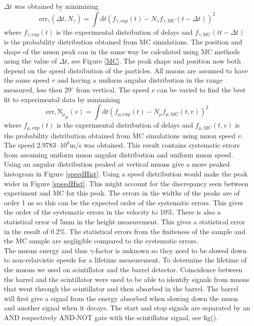 \documentclass[10pt,twocolumn]{article}
\begin{document}
$\Delta t$ was obtained by minimizing
\begin{equation}
 \mathrm{err}_\gamma(\Delta t, N_\gamma)=\int\mathrm{d}t\left(f_{\gamma,\mathrm{exp}}(t)-N_\gamma f_{\gamma,\mathrm{MC}}(t-\Delta t)\right)^2
\end{equation}
where $f_{\gamma,\mathrm{exp}}(t)$ is the experimental distribution of delays and $f_{\gamma,\mathrm{MC}}(tt-\Delta t)$ is the probability distribution obtained from MC simulations. The position and shape of the muon peak can in the same way be calculated using MC methods using the value of $\Delta t$, see Figure \ref{MC}. The peak shape and position now both depend on the speed distribution of the particles. All muons are assumed to have the same speed $v$ and having a uniform angular distribution in the range measured, less then $29^\circ$ from vertical. The speed $v$ can be varied to find the best fit to experimental data by minimizing
\begin{equation}
 \mathrm{err,N_\mu}_\mu(v)=\int\mathrm{d}t\left(f_{\mu,\mathrm{exp}}(t)-N_\mu f_{\mu,\mathrm{MC}}(t,v)\right)^2
\end{equation}
where $f_{\mu,\mathrm{exp}}(t)$ is the experimental distribution of delays and $f_{\mu,\mathrm{MC}}(t,v)$ is the probability distribution obtained from MC simulations using muon speed $v$. The speed $2.9783\cdot10^8$m/s was obtained. This result contains systematic errors from assuming uniform muon angular distribution and uniform muon speed. Using an angular distribution peaked at vertical muons give a more peaked histogram in Figure \ref{speedHist}. Using a speed distribution would make the peak wider in Figure \ref{speedHist}. This might account for the discrepancy seen between experiment and MC for this peak. The errors in the widths of the peaks are of order 1 ns so this can be the expected order of the systematic errors. This gives the order of the systematic errors in the velocity to 10\%. There is also a statistical error of 5mm in the height measurement. This gives a statistical error in the result of 0.2\%. The statistical errors from the finiteness of the sample and the MC sample are negligible compared to the systematic errors.\\

The muons energy and thus $\gamma$-factor is unknown so they need to be slowed down to non-relaivistic speeds for a lifetime measurement. To determine the lifetime of the muons we used on scintillator and the barrel detector. Coincidence between the barrel and the scintillator were used to be able to identify signals from muons that went through the scintillator and then absorbed in the barrel. The barrel will first give a signal from the energy absorbed when slowing down the muon and another signal when it decays. The start and stop signals are separated by an AND respectively AND-NOT gate with the scintillator signal, see fig().
\end{document}
